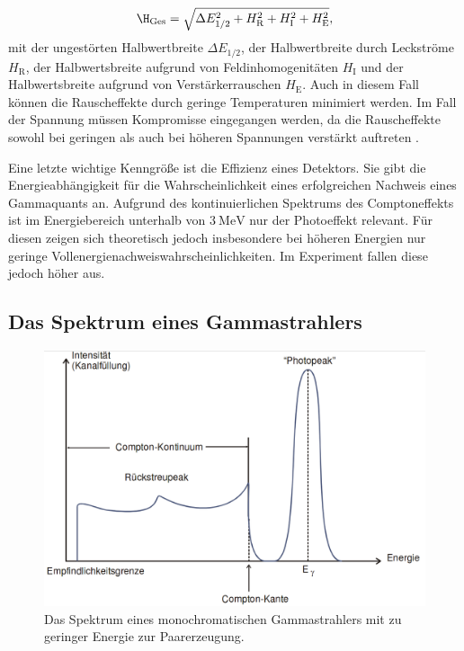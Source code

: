 \begin{equation}
    \H_\text{Ges} = \sqrt{\Delta E_\text{1/2}^2 + H_\text{R}^2 + H_\text{I}^2 + H_\text{E}^2},
\end{equation}
mit der ungestörten Halbwertbreite $\Delta E_\text{1/2}$, der Halbwertbreite durch Leckströme $H_\text{R}$, der Halbwertsbreite aufgrund von Feldinhomogenitäten $H_\text{I}$ und der Halbwertsbreite aufgrund von Verstärkerrauschen $H_\text{E}$.
Auch in diesem Fall können die Rauscheffekte durch geringe Temperaturen minimiert werden. Im Fall der Spannung müssen Kompromisse eingegangen werden, da die Rauscheffekte sowohl bei geringen als auch bei höheren Spannungen verstärkt auftreten .

Eine letzte wichtige Kenngröße ist die Effizienz eines Detektors. Sie gibt die Energieabhängigkeit für die Wahrscheinlichkeit eines erfolgreichen Nachweis eines Gammaquants an. Aufgrund des kontinuierlichen Spektrums des Comptoneffekts ist im Energiebereich unterhalb von $\SI{3}{\mega\electronvolt}$ nur der Photoeffekt relevant. Für diesen zeigen sich theoretisch jedoch insbesondere bei höheren Energien nur geringe Vollenergienachweiswahrscheinlichkeiten. Im Experiment fallen diese jedoch höher aus. 

\subsection{Das Spektrum eines Gammastrahlers}

\begin{figure}
	\centering
	\includegraphics[width=\linewidth-100pt,height=\textheight-100pt,keepaspectratio]{content/Images/spek.png}
    \caption{Das Spektrum eines monochromatischen Gammastrahlers mit zu geringer Energie zur Paarerzeugung\cite{V18}.}
    \label{fig:spektrum}
\end{figure}

